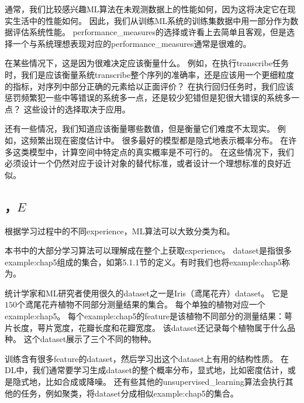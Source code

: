
通常，我们比较感兴趣\gls{ML}算法在未观测数据上的性能如何，因为这将决定它在现实生活中的性能如何。
因此，我们从训练\gls{ML}系统的训练集数据中用一部分作为数据评估系统性能。
\gls{performance_measures}的选择或许看上去简单且客观，但是选择一个与系统理想表现对应的\gls{performance_measures}通常是很难的。

在某些情况下，这是因为很难决定应该衡量什么。
例如，在执行\gls{transcribe}任务时，我们是应该衡量系统\gls{transcribe}整个序列的准确率，还是应该用一个更细粒度的指标，对序列中部分正确的元素给以正面评价？
在执行回归任务时，我们应该惩罚频繁犯一些中等错误的系统多一点，还是较少犯错但是犯很大错误的系统多一点？
这些设计的选择取决于应用。

还有一些情况，我们知道应该衡量哪些数值，但是衡量它们难度不太现实。
例如，这频繁出现在密度估计中。
很多最好的模型都是隐式地表示概率分布。
在许多这类模型中，计算空间中特定点的真实概率是不可行的。
在这些情况下，我们必须设计一个仍然对应于设计对象的替代标准，或者设计一个理想标准的良好近似。

\subsection{，$E$}
\label{sec:the_experience_e}
根据学习过程中的不同\gls{experience}，\gls{ML}算法可以大致分类为和。

本书中的大部分学习算法可以理解成在整个上获取\gls{experience}。
\gls{dataset}是指很多\gls{example:chap5}组成的集合，如第5.1.1节的定义。有时我们也将\gls{example:chap5}称为。


统计学家和\gls{ML}研究者使用很久的\gls{dataset}之一是Iris（鸢尾花卉）\gls{dataset}\citep{Fisher-1936}。
它是$150$个鸢尾花卉植物不同部分测量结果的集合。
每个单独的植物对应一个\gls{example:chap5}。
每个\gls{example:chap5}的\gls{feature}是该植物不同部分的测量结果：萼片长度，萼片宽度，花瓣长度和花瓣宽度。
该\gls{dataset}还记录每个植物属于什么品种。
这个\gls{dataset}展示了三个不同的物种。

训练含有很多\gls{feature}的\gls{dataset}，然后学习出这个\gls{dataset}上有用的结构性质。
在\gls{DL}中，我们通常要学习生成\gls{dataset}的整个概率分布，显式地，比如密度估计，或是隐式地，比如合成或降噪。
还有些其他的\gls{unsupervised_learning}算法会执行其他的任务，例如聚类，将\gls{dataset}分成相似\gls{example:chap5}的集合。

